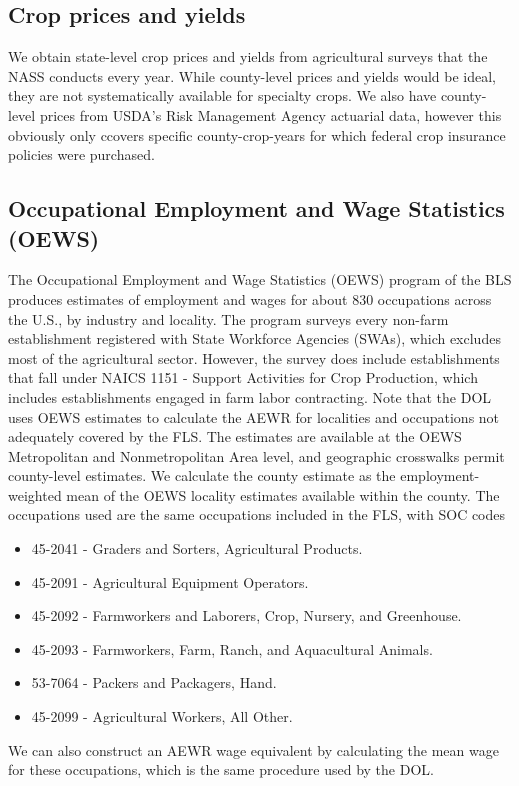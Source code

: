 \documentclass[14pt]{article}
\begin{document}
\subsection{Crop prices and yields}
We obtain state-level crop prices and yields from agricultural surveys that the NASS conducts every year.
While county-level prices and yields would be ideal, they are not systematically available for specialty crops.
We also have county-level prices from USDA's Risk Management Agency actuarial data, however this obviously only ccovers specific county-crop-years for which federal crop insurance policies were purchased.

\subsection{Occupational Employment and Wage Statistics (OEWS)}

The Occupational Employment and Wage Statistics (OEWS) program of the BLS produces estimates of employment and wages for about 830 occupations across the U.S., by industry and locality.
The program surveys every non-farm establishment registered with State Workforce Agencies (SWAs), which excludes most of the agricultural sector.
However, the survey does include establishments that fall under NAICS 1151 - Support Activities for Crop Production, which includes establishments engaged in farm labor contracting.
Note that the DOL uses OEWS estimates to calculate the AEWR for localities and occupations not adequately covered by the FLS.
The estimates are available at the OEWS Metropolitan and Nonmetropolitan Area level, and geographic crosswalks permit county-level estimates.
We calculate the county estimate as the employment-weighted mean of the OEWS locality estimates available within the county.
The occupations used are the same occupations included in the FLS, with SOC codes
\begin{itemize}
	\item 45-2041 - Graders and Sorters, Agricultural Products.
	\item 45-2091 - Agricultural Equipment Operators.
	\item 45-2092 - Farmworkers and Laborers, Crop, Nursery, and Greenhouse.
	\item 45-2093 - Farmworkers, Farm, Ranch, and Aquacultural Animals.
	\item 53-7064 - Packers and Packagers, Hand.
	\item 45-2099 - Agricultural Workers, All Other.
\end{itemize}
We can also construct an AEWR wage equivalent by calculating the mean wage for these occupations, which is the same procedure used by the DOL.
\end{document}
